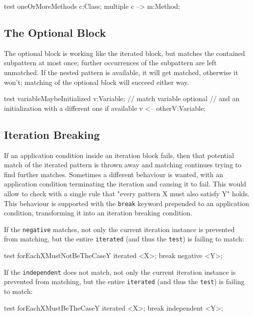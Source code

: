\begin{example}
  \begin{grgen}
test oneOrMoreMethods
{
  c:Class;
  multiple {
    c --> m:Method;
  }
}
  \end{grgen}
\end{example}

\subsection*{The Optional Block}
The optional block is working like the iterated block, but matches the contained subpattern at most once; further occurrences of the subpattern are left unmatched.
If the nested pattern is available, it will get matched, otherwise it won't; matching of the optional block will succeed either way.

\begin{example}
  \begin{grgen}
test variableMaybeInitialized
{
  v:Variable; // match variable
  optional { // and an initialization with a different one if available
    v <-- otherV:Variable;
  }
}
  \end{grgen}
\end{example}

\subsection*{Iteration Breaking} 
If an application condition inside an iteration block fails, then that potential match of the iterated pattern is thrown away and matching continues trying to find further matches.
Sometimes a different behaviour is wanted, with an application condition terminating the iteration and causing it to fail.
This would allow to check with a single rule that "every pattern X must also satisfy Y" holds.
This behaviour is supported with the \texttt{break} keyword prepended to an application condition, transforming it into an iteration breaking condition.

\begin{example}
If the \texttt{negative} matches, not only the current iteration instance is prevented from matching, but the entire \texttt{iterated} (and thus the \texttt{test}) is failing to match:
  \begin{grgen}
test forEachXMustNotBeTheCaseY
{
  iterated {
    <X>;
    break negative { 
      <Y>;
    }
  }
}
  \end{grgen}

If the \texttt{independent} does not match, not only the current iteration instance is prevented from matching, but the entire \texttt{iterated} (and thus the \texttt{test}) is failing to match:
  \begin{grgen}
test forEachXMustBeTheCaseY
{
  iterated {
    <X>;
    break independent { 
      <Y>;
    }
  }
}
  \end{grgen}
\end{example}

